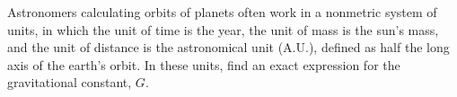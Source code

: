 Astronomers calculating orbits of planets often work in a nonmetric system of
        units, in which the unit of time is the year, the unit of mass is the sun's mass,
        and the unit of distance is the
        astronomical unit (A.U.), defined as half the long axis of the earth's orbit.
        In these units, find an exact expression for the gravitational constant, $G$.\answercheck

